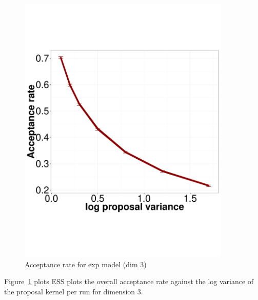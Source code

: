   \begin{figure}[H]
  \centering
  \begin{minipage}[hp]{0.45\linewidth}
  \centering
    \includegraphics [width=0.90\textwidth, angle=0]{figs/acc_rate_exp_d3.pdf}
      \end{minipage}
    \caption{Acceptance rate for exp model (dim 3)}
	\label{fig:acc_exp}
  \end{figure}

Figure~\ref{fig:acc_exp} plots ESS plots the overall  acceptance rate against 
the log variance of the proposal kernel per run for dimension $3$. 



